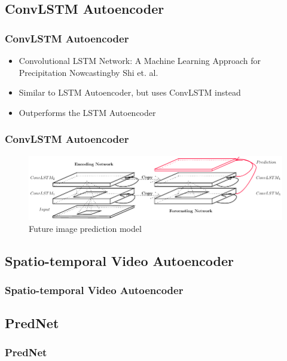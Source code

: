  \subsection{ConvLSTM Autoencoder}
  \begin{frame}
   \frametitle{ConvLSTM Autoencoder}
   
   \begin{itemize}
    \item<1-> \glqq Convolutional LSTM Network: A Machine Learning Approach for Precipitation Nowcasting\grqq by Shi et. al. \citep{Shi2015}
    \item<2-> Similar to LSTM Autoencoder, but uses ConvLSTM instead
    \item<3-> Outperforms the LSTM Autoencoder
   \end{itemize}
   
  \end{frame}
  \begin{frame}
   \frametitle{ConvLSTM Autoencoder}
   
   \begin{figure}[H]
    \includegraphics[width=1.0\textwidth]{../Images/shi.png}
    \centering
    \caption{Future image prediction model \citep{Shi2015}}
    \label{fig:lstm_architecture}
  \end{figure}
  
  \end{frame}
 
 \subsection{Spatio-temporal Video Autoencoder}
  \begin{frame}
   \frametitle{Spatio-temporal Video Autoencoder}
   
  \end{frame}
 
 \subsection{PredNet}
  \begin{frame}
   \frametitle{PredNet}
   
  \end{frame}
